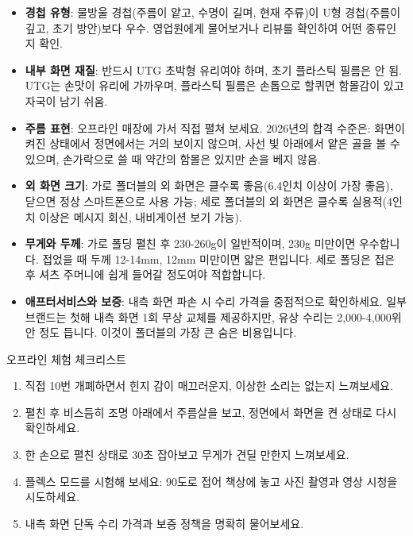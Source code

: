 \begin{itemize}
  \item \textbf{경첩 유형}: 물방울 경첩(주름이 얕고, 수명이 길며, 현재 주류)이 U형 경첩(주름이 깊고, 초기 방안)보다 우수. 영업원에게 물어보거나 리뷰를 확인하여 어떤 종류인지 확인.
  \item \textbf{내부 화면 재질}: 반드시 UTG 초박형 유리여야 하며, 초기 플라스틱 필름은 안 됨. UTG는 손맛이 유리에 가까우며, 플라스틱 필름은 손톱으로 할퀴면 함몰감이 있고 자국이 남기 쉬움.
  \item \textbf{주름 표현}: 오프라인 매장에 가서 직접 펼쳐 보세요. 2026년의 합격 수준은: 화면이 켜진 상태에서 정면에서는 거의 보이지 않으며, 사선 빛 아래에서 얕은 골을 볼 수 있으며, 손가락으로 쓸 때 약간의 함몰은 있지만 손을 베지 않음.
  \item \textbf{외 화면 크기}: 가로 폴더블의 외 화면은 클수록 좋음(6.4인치 이상이 가장 좋음), 닫으면 정상 스마트폰으로 사용 가능; 세로 폴더블의 외 화면은 클수록 실용적(4인치 이상은 메시지 회신, 내비게이션 보기 가능).
  \item \textbf{무게와 두께}: 가로 폴딩 펼친 후 230-260g이 일반적이며, 230g 미만이면 우수합니다. 접었을 때 두께 12-14mm, 12mm 미만이면 얇은 편입니다. 세로 폴딩은 접은 후 셔츠 주머니에 쉽게 들어갈 정도여야 적합합니다.
  \item \textbf{애프터서비스와 보증}: 내측 화면 파손 시 수리 가격을 중점적으로 확인하세요. 일부 브랜드는 첫해 내측 화면 1회 무상 교체를 제공하지만, 유상 수리는 2,000-4,000위안 정도 듭니다. 이것이 폴더블의 가장 큰 숨은 비용입니다.
\end{itemize}

\begin{tcbpractice}{오프라인 체험 체크리스트}
\begin{enumerate}
  \item 직접 10번 개폐하면서 힌지 감이 매끄러운지, 이상한 소리는 없는지 느껴보세요.
  \item 펼친 후 비스듬히 조명 아래에서 주름살을 보고, 정면에서 화면을 켠 상태로 다시 확인하세요.
  \item 한 손으로 펼친 상태로 30초 잡아보고 무게가 견딜 만한지 느껴보세요.
  \item 플렉스 모드를 시험해 보세요: 90도로 접어 책상에 놓고 사진 촬영과 영상 시청을 시도하세요.
  \item 내측 화면 단독 수리 가격과 보증 정책을 명확히 물어보세요.
\end{enumerate}

\end{tcbpractice}


